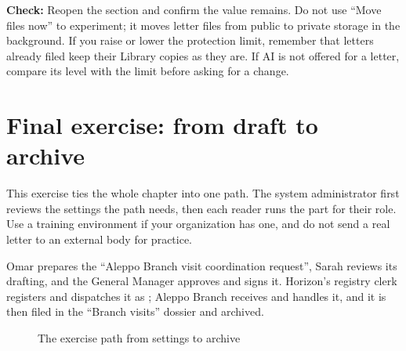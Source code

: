 \textbf{Check:} Reopen the section and confirm the value remains. Do not use “Move files now” to experiment; it moves letter files from public to private storage in the background. If you raise or lower the protection limit, remember that letters already filed keep their Library copies as they are. If AI is not offered for a letter, compare its level with the limit before asking for a change.

\clearpage
\section{Final exercise: from draft to archive}
\label{sec:correspondence-feature-practice}

This exercise ties the whole chapter into one path. The system administrator first reviews the settings the path needs, then each reader runs the part for their role. Use a training environment if your organization has one, and do not send a real letter to an external body for practice.

\begin{rcnote}
Omar prepares the “Aleppo Branch visit coordination request”, Sarah reviews its drafting, and the General Manager approves and signs it. Horizon’s registry clerk registers and dispatches it as ; Aleppo Branch receives and handles it, and it is then filed in the “Branch visits” dossier and archived.
\end{rcnote}

\begin{figure}[H]
\centering
{}
\rclegend
\caption{The exercise path from settings to archive}
\label{fig:correspondence-practice-screen}
\end{figure}

